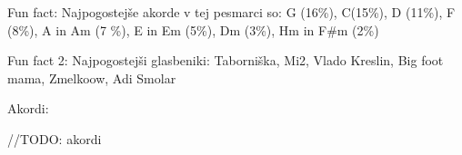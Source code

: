 \begin{akordi}

    Fun fact:
    Najpogostejše akorde v tej pesmarci so:
    G (16\%), C(15\%), D (11\%), F (8\%), A in Am (7 \%), E in Em (5\%), Dm (3\%), Hm in F#m (2\%)

    Fun fact 2:
    Najpogostejši glasbeniki: Taborniška, Mi2, Vlado Kreslin, Big foot mama, Zmelkoow, Adi Smolar

    Akordi:

//TODO: akordi


\end{akordi}